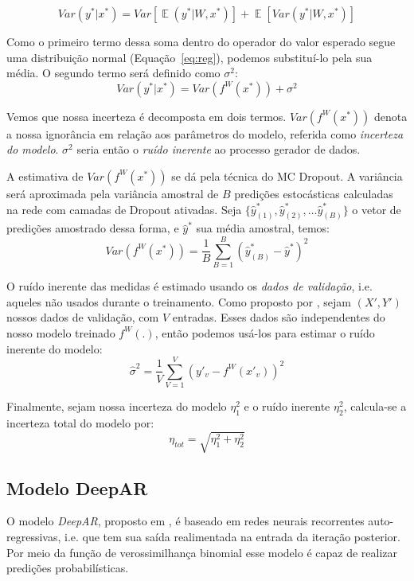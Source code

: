 \[ Var(y^* | x^*) = Var[\mathop{\mathbb{E}}(y^* | W,x^*)] +
  \mathop{\mathbb{E}}[Var(y^* | W,x^*)] \]

Como o primeiro termo dessa soma dentro do operador do valor esperado segue uma distribuição normal
(Equação~\ref{eq:reg}), podemos substituí-lo pela sua média. O
segundo termo será definido como $\sigma^2$: \\ 
 
\[ Var(y^* | x^*) = Var(f^W(x^*)) + \sigma^2 \] 


Vemos que nossa incerteza é decomposta em dois termos. $Var(f^W(x^*))$ denota a
nossa ignorância em relação aos parâmetros do modelo, referida como
\textit{incerteza do modelo}. $\sigma^2$ seria então o \textit{ruído inerente} ao
processo gerador de dados.
 
A estimativa de $Var(f^W(x^*))$ se dá pela técnica do MC Dropout. A variância
será aproximada pela variância amostral de $B$ predições estocásticas calculadas
na rede com camadas de Dropout ativadas. Seja $\{\hat{y}^*_{(1)},\hat{y}^*_{(2)}, \dots
\hat{y}^*_{(B)}\}$ o vetor de predições amostrado dessa forma, e $\hat{y}^*$ sua
média amostral, temos: \\

\[   Var(f^W(x^*))  = \frac{1}{B}\sum^B_{B=1}(\hat{y}^*_{(B)} - \hat{y}^*)^2  \]


O ruído inerente das medidas é estimado usando os \textit{dados de validação},
i.e. aqueles não
usados durante o treinamento. Como
proposto por \citep{ubertime}, sejam $(X',Y')$ nossos dados de validação, com
$V$ entradas. Esses dados são independentes do nosso modelo
treinado $f^W(.)$, então podemos usá-los para estimar o ruído inerente do
modelo: \\

\[ \hat{\sigma}^2 = \frac{1}{V}\sum^V_{V=1}(y'_v - f^W(x'_v))^2 \]

Finalmente, sejam nossa incerteza do modelo $\eta_1^2$ e o ruído inerente
$\eta^2_2$, calcula-se a incerteza total do modelo por: \\

\[  \eta_{tot} = \sqrt{  \eta_1^2 + \eta_2^2 }  \]


\subsection{Modelo DeepAR}

O modelo \textit{DeepAR}, proposto em \citep{deepar}, é baseado em redes neurais recorrentes auto-regressivas,
i.e. que tem sua saída realimentada na entrada da iteração posterior. Por meio da função de verossimilhança binomial esse modelo é capaz
de realizar predições probabilísticas.


